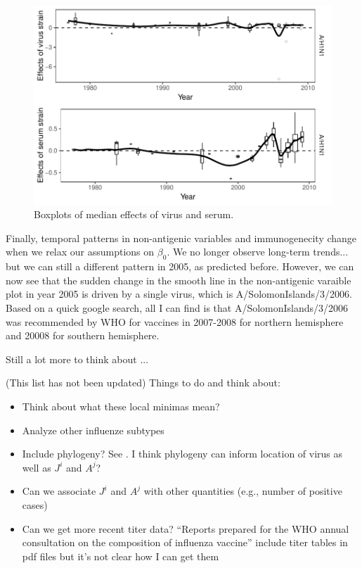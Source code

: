 \documentclass[12pt]{article}
\begin{document}
\begin{figure}
\includegraphics[width=\textwidth]{../figure/h1n1_effect_relax.pdf}
\caption{Boxplots of median effects of virus and serum.}
\end{figure}

Finally, temporal patterns in non-antigenic variables and immunogenecity change when we relax our assumptions on $\beta_0$.
We no longer observe long-term trends... but we can still a different pattern in 2005, as predicted before.
However, we can now see that the sudden change in the smooth line in the non-antigenic varaible plot in year 2005 is driven by a single virus, which is A/SolomonIslands/3/2006.
Based on a quick google search, all I can find is that A/SolomonIslands/3/2006 was recommended by WHO for vaccines in 2007-2008 for northern hemisphere and 20008 for southern hemisphere.

Still a lot more to think about ...

(This list has not been updated) Things to do and think about:
\begin{itemize}
	\item Think about what these local minimas mean?
	\item Analyze other influenze subtypes
	\item Include phylogeny? See \cite{bedford2014integrating}. I think phylogeny can inform location of virus as well as $J^i$ and $A^j$?
	\item Can we associate $J^i$ and $A^j$ with other quantities (e.g., number of positive cases)
	\item Can we get more recent titer data? ``Reports prepared for the WHO annual consultation on the composition of influenza vaccine'' include titer tables in pdf files but it's not clear how I can get them
\end{itemize}




\end{document}
